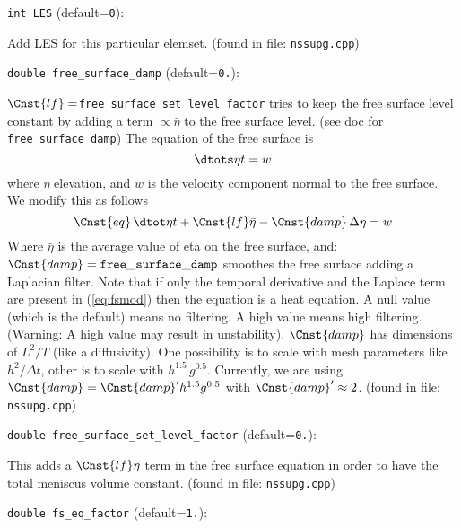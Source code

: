 \item\verb+int LES+ {\rm(default=\verb|0|)}:

Add LES for this particular elemset.
 (found in file: \verb+nssupg.cpp+)
\item\verb+double free_surface_damp+ {\rm(default=\verb|0.|)}:

$\Cnst{lf}=${\tt free\_surface\_set\_level\_factor} tries to
keep the free surface level constant by adding a term $\propto
\bar\eta$ to the free surface level.  (see doc for {\tt
free\_surface\_damp})
\label{sec:free_surface}
The equation of the free surface is
%
\begin{equation} 
\dtots\eta t = w
\end{equation}
%
where $\eta$ 
elevation, and $w$ is the velocity component normal to the free
surface. We modify this as follows 
%
\begin{equation} \label{eq:fsmod}  
\Cnst{eq}\,\dtot\eta t 
   + \Cnst{lf} \bar{\eta} - \Cnst{damp} \, \Delta \eta = w
\end{equation}
%
Where $\bar\eta$ is the average value of eta on the free surface, and:
$\Cnst{damp}={\tt free\_surface\_damp}$ smoothes the free surface
adding a Laplacian filter.  Note that if only the temporal derivative
and the Laplace term are present in (\ref{eq:fsmod}) then the equation
is a heat equation. A null value (which is the default) means no
filtering. A high value means high filtering. (Warning: A high value
may result in unstability).  $\Cnst{damp}$ has dimensions of $L^2/T$
(like a diffusivity). One possibility is to scale with mesh parameters
like $h^2/\Delta t$, other is to scale with $h^{1.5} \,
g^{0.5}$. Currently, we are using $\Cnst{damp} = \Cnst{damp}' h^{1.5}
g^{0.5}$ with $\Cnst{damp}'\approx 2$.
 (found in file: \verb+nssupg.cpp+)
\item\verb+double free_surface_set_level_factor+ {\rm(default=\verb|0.|)}:

This adds a $\Cnst{lf}\bar\eta$ term in the free surface equation
in order to have the total meniscus volume constant. 
 (found in file: \verb+nssupg.cpp+)
\item\verb+double fs_eq_factor+ {\rm(default=\verb|1.|)}:

